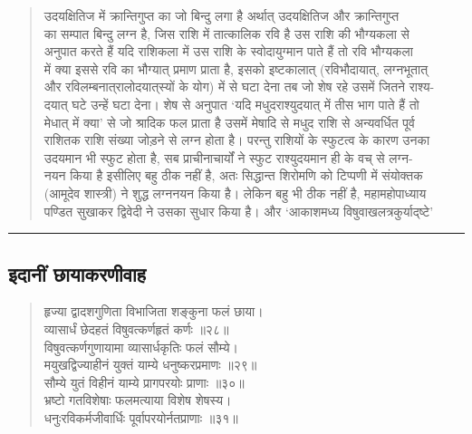 \documentclass[11pt,a4paper]{article}
\newcommand{\longline}{\noindent\rule{\textwidth}{0.4pt}}
\newcommand{\dev}[1]{{\devanagarifont #1}}
\newenvironment{shloka}{%
  \begin{quote}
  \small
  \setlength{\leftmargin}{2em}
  \devanagarifont
}{\end{quote}}
\newenvironment{vyakhya}{%
  \begin{quote}
  \small
  \setlength{\leftmargin}{1em}
  \devanagarifont
}{\end{quote}}
\newcommand{\skt}[1]{{\devanagarifont #1}}
\begin{document}
\begin{vyakhya}
\skt{उदयक्षितिज में क्रान्तिगुप्त का जो बिन्दु लगा है अर्थात् उदयक्षितिज और क्रान्तिगुप्त}\\
\skt{का सम्पात बिन्दु लग्न है, जिस राशि में तात्कालिक रवि है उस राशि की भौग्यकला से}\\
\skt{अनुपात करते हैं यदि राशिकला में उस राशि के स्वोदायुग्मान पाते हैं तो रवि भौग्यकला}\\
\skt{में क्या इससे रवि का भौग्यात् प्रमाण प्राता है, इसको इष्टकालात् (रविभौदायात्, लग्नभूतात्}\\
\skt{और रविलम्बनात्‌रालोदयात्‌स्यों के योग) में से घटा देना तब जो शेष रहे उसमें जितने राश्य-}\\
\skt{दयात् घटे उन्हें घटा देना। शेष से अनुपात ‘यदि मधुदराश्युदयात् में तीस भाग पाते हैं तो}\\
\skt{मेधात् में क्या' से जो श्रादिक फल प्राता है उसमें मेषादि से मधुद राशि से अन्यवर्धित पूर्व}\\
\skt{राशितक राशि संख्या जोड़ने से लग्न होता है। परन्तु राशियों के स्फुटत्व के कारण उनका}\\
\skt{उदयमान भी स्फुट होता है, सब प्राचीनाचार्यों ने स्फुट राश्युदयमान ही के वच् से लग्न-}\\
\skt{नयन किया है इसीलिए बहु ठीक नहीं है, अतः सिद्धान्त शिरोमणि को टिप्पणी में संयोक्तक}\\
\skt{(आमूदेव शास्त्री) ने शुद्ध लग्ननयन किया है। लेकिन बहु भी ठीक नहीं है, महामहोपाध्याय}\\
\skt{पण्डित सुखाकर द्विवेदी ने उसका सुधार किया है। और ‘आकाशमध्य विषुवाखलत्रकुर्याद्‌ष्टे'}
\end{vyakhya}

\longline

\subsection{\dev{इदानीं छायाकरणीवाह}}

\begin{shloka}
\skt{हृज्या द्वादशगुणिता विभाजिता शङ्कुना फलं छाया।}\\
\skt{व्यासार्धं छेदहतं विषुवत्कर्णहृतं कर्णः ॥२८॥}\\[0.3em]
\skt{विषुवत्कर्णगुणायामा व्यासार्धकृतिः फलं सौम्ये।}\\
\skt{मयुखद्विज्याहीनं युक्तं याम्ये धनुष्करप्रमाणः ॥२९॥}\\[0.3em]
\skt{सौम्ये युतं विहीनं याम्ये प्रागपरयोः प्राणाः ॥३०॥}\\[0.3em]
\skt{भ्रष्टो गतविशेषाः फलमत्याया विशेष शेषस्य।}\\
\skt{धनुःरविकर्मजीवार्धिः पूर्वापरयोर्नतप्राणाः ॥३१॥}
\end{shloka}
\end{document}

